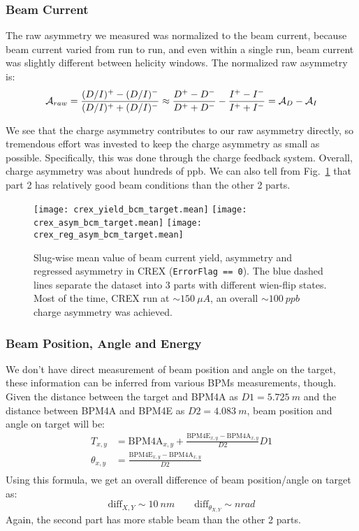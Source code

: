 \subsubsection{Beam Current}
The raw asymmetry we measured was normalized to the beam current, because beam
current varied from run to run, and even within a single run, beam current was 
slightly different between helicity windows. The normalized raw asymmetry is:
\begin{equation}
    \mathcal{A}_{raw} = \frac{(D/I)^+ - (D/I)^-}{(D/I)^+ + (D/I)^-}
	\approx \frac{D^+ - D^-}{D^+ + D^-} - \frac{I^+ - I^-}{I^+ + I^-}
	= \mathcal{A}_D - \mathcal{A}_I
\end{equation}

We see that the charge asymmetry contributes to our raw asymmetry directly, so
tremendous effort was invested to keep the charge asymmetry as small as possible.
Specifically, this was done through the charge feedback system. Overall, charge
asymmetry was about hundreds of ppb. We can also tell from Fig.~\ref{fig:crex_bcm_target}
that part 2 has relatively good beam conditions than the other 2 parts.
\begin{figure}[H]
    \centering
    \texttt{[image: crex\_yield\_bcm\_target.mean]}
    \texttt{[image: crex\_asym\_bcm\_target.mean]}
    \texttt{[image: crex\_reg\_asym\_bcm\_target.mean]}
    \caption{Slug-wise mean value of beam current yield, asymmetry and regressed 
    asymmetry in CREX (\texttt{ErrorFlag == 0}). The blue dashed lines separate
    the dataset into 3 parts with different wien-flip states.
    Most of the time, CREX run at $\sim 150\ \mu A$, an overall $\sim 100\ ppb$ charge 
    asymmetry was achieved.}
    \label{fig:crex_bcm_target}
\end{figure}

\subsubsection{Beam Position, Angle and Energy}
We don't have direct measurement of beam position and angle on the target, these 
information can be inferred from various BPMs measurements, though. Given the 
distance between the target and BPM4A as $D1 = 5.725\ m$ and the distance
between BPM4A and BPM4E as $D2 =4.083\ m$, beam position and angle on target 
will be:
\begin{equation}
    \begin{aligned}
	T_{x,y} &= \text{BPM4A}_{x,y} + \frac{\text{BPM4E}_{x,y} - \text{BPM4A}_{x,y}}{D2} D1	\\
	\theta_{x,y} &= \frac{\text{BPM4E}_{x,y} - \text{BPM4A}_{x,y}}{D2} \\
    \end{aligned}
\end{equation}
Using this formula, we get an overall difference of beam position/angle on target as:
\begin{equation*}
    \text{diff}_{X,Y} \sim 10\ nm	\qquad \text{diff}_{\theta_{X,Y}} \sim nrad	
\end{equation*}
Again, the second part has more stable beam than the other 2 parts.

